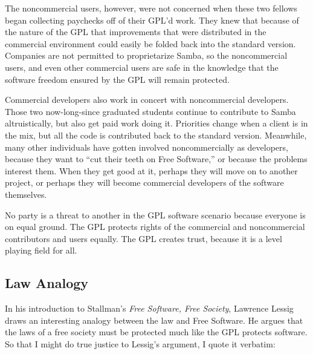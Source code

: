 The noncommercial users, however, were not concerned when these two
fellows began collecting paychecks off of their GPL'd work.  They knew
that because of the nature of the GPL that improvements that were
distributed in the commercial environment could easily be folded back into
the standard version.  Companies are not permitted to proprietarize
Samba, so the noncommercial users, and even other commercial users are
safe in the knowledge that the software freedom ensured by the GPL will remain
protected.

Commercial developers also work in concert with noncommercial
developers.  Those two now-long-since graduated students continue to
contribute to Samba altruistically, but also get paid work doing it.
Priorities change when a client is in the mix, but all the code is
contributed back to the standard version.  Meanwhile, many other
individuals have gotten involved noncommercially as developers,
because they want to ``cut their teeth on Free Software,'' or because
the problems interest them.  When they get good at it, perhaps they
will move on to another project, or perhaps they will become
commercial developers of the software themselves.

No party is a threat to another in the GPL software scenario because
everyone is on equal ground.  The GPL protects rights of the commercial
and noncommercial contributors and users equally. The GPL creates trust,
because it is a level playing field for all.

\subsection{Law Analogy}

In his introduction to Stallman's \emph{Free Software, Free Society},
Lawrence Lessig draws an interesting analogy between the law and Free
Software. He argues that the laws of a free society must be protected
much like the GPL protects software.  So that I might do true justice to
Lessig's argument, I quote it verbatim:

